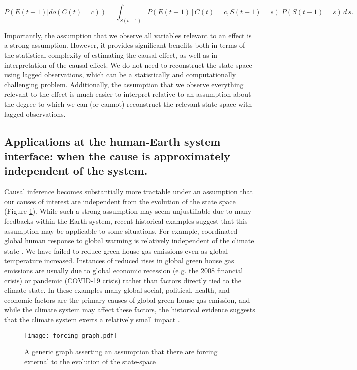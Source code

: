\documentclass[12pt]{article}
\begin{document}
\begin{equation} P(E(t+1)| do(C(t)=c)) = \int_{S(t-1)} P(E(t+1) \, |
  \, C(t)=c, S(t-1) = s )\; P(S(t-1)=s) \, d \, s.
\end{equation}

Importantly, the assumption that we observe all variables relevant to
an effect is a strong assumption. However, it provides significant
benefits both in terms of the statistical complexity of estimating the
causal effect, as well as in interpretation of the causal effect. We
do not need to reconstruct the state space using lagged observations,
which can be a statistically and computationally challenging
problem. Additionally, the assumption that we observe everything
relevant to the effect is much easier to interpret relative to an
assumption about the degree to which we can (or cannot) reconstruct
the relevant state space with lagged observations.

\subsection{Applications at the human-Earth system interface: when the
  cause is approximately independent of the system.}
\label{human}

Causal inference becomes substantially more tractable under an
assumption that our causes of interest are independent from the
evolution of the state space (Figure \ref{fig:forcing}). While such a
strong assumption may seem unjustifiable due to many feedbacks within
the Earth system, recent historical examples suggest that this
assumption may be applicable to some situations. For example,
coordinated global human response to global warming is relatively
independent of the climate state \citep{arto2014drivers}. We have
failed to reduce green house gas emissions even as global temperature
increased. Instances of reduced rises in global green house gas
emissions are usually due to global economic recession (e.g. the 2008
financial crisis) or pandemic (COVID-19 crisis) rather than factors
directly tied to the climate state. In these examples many global
social, political, health, and economic factors are the primary causes
of global green house gas emission, and while the climate system may
affect these factors, the historical evidence suggests that the
climate system exerts a relatively small impact
\citep{arto2014drivers}.

\begin{figure} \texttt{[image: forcing-graph.pdf]}
  \caption{A generic graph asserting an assumption that there are
    forcing external to the evolution of the state-space}
  \label{fig:forcing}
\end{figure}
\end{document}
